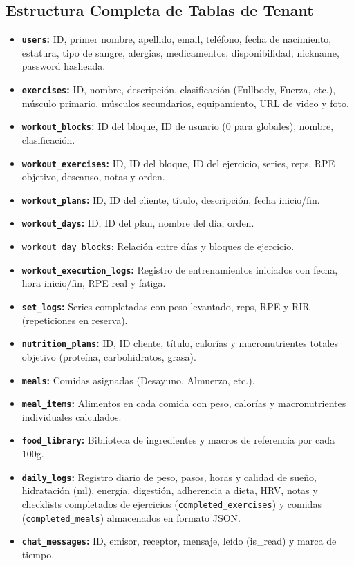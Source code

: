 \documentclass[11pt]{article}
\begin{document}
\subsection{Estructura Completa de Tablas de Tenant}
\begin{itemize}
    \item \textbf{\texttt{users}:} ID, primer nombre, apellido, email, teléfono, fecha de nacimiento, estatura, tipo de sangre, alergias, medicamentos, disponibilidad, nickname, password hasheada.
    \item \textbf{\texttt{exercises}:} ID, nombre, descripción, clasificación (Fullbody, Fuerza, etc.), músculo primario, músculos secundarios, equipamiento, URL de video y foto.
    \item \textbf{\texttt{workout\_blocks}:} ID del bloque, ID de usuario (0 para globales), nombre, clasificación.
    \item \textbf{\texttt{workout\_exercises}:} ID, ID del bloque, ID del ejercicio, series, reps, RPE objetivo, descanso, notas y orden.
    \item \textbf{\texttt{workout\_plans}:} ID, ID del cliente, título, descripción, fecha inicio/fin.
    \item \textbf{\texttt{workout\_days}:} ID, ID del plan, nombre del día, orden.
    \item \texttt{workout\_day\_blocks}: Relación entre días y bloques de ejercicio.
    \item \textbf{\texttt{workout\_execution\_logs}:} Registro de entrenamientos iniciados con fecha, hora inicio/fin, RPE real y fatiga.
    \item \textbf{\texttt{set\_logs}:} Series completadas con peso levantado, reps, RPE y RIR (repeticiones en reserva).
    \item \textbf{\texttt{nutrition\_plans}:} ID, ID cliente, título, calorías y macronutrientes totales objetivo (proteína, carbohidratos, grasa).
    \item \textbf{\texttt{meals}:} Comidas asignadas (Desayuno, Almuerzo, etc.).
    \item \textbf{\texttt{meal\_items}:} Alimentos en cada comida con peso, calorías y macronutrientes individuales calculados.
    \item \textbf{\texttt{food\_library}:} Biblioteca de ingredientes y macros de referencia por cada 100g.
    \item \textbf{\texttt{daily\_logs}:} Registro diario de peso, pasos, horas y calidad de sueño, hidratación (ml), energía, digestión, adherencia a dieta, HRV, notas y checklists completados de ejercicios (\texttt{completed\_exercises}) y comidas (\texttt{completed\_meals}) almacenados en formato JSON.
    \item \textbf{\texttt{chat\_messages}:} ID, emisor, receptor, mensaje, leído (is\_read) y marca de tiempo.
\end{itemize}
\end{document}
